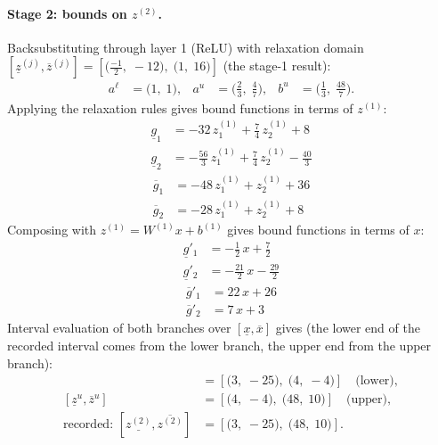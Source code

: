 \documentclass[11pt]{article}
\begin{document}
\paragraph{Stage 2: bounds on $z^{(2)}$.}
Backsubstituting through layer 1 (ReLU) with relaxation domain $[\underline{z}^{(j)}, \overline{z}^{(j)}] = [\bigl(\frac{-1}{2},\; -12\bigr),\; \bigl(1,\; 16\bigr)]$ (the stage-1 result):
\begin{align*}
a^{\ell} &= \bigl(1,\; 1\bigr), & a^{u} &= \bigl(\frac{2}{3},\; \frac{4}{7}\bigr), & b^{u} &= \bigl(\frac{1}{3},\; \frac{48}{7}\bigr).
\end{align*}
Applying the relaxation rules gives bound functions in terms of $z^{(1)}$:
\begin{align*}
\underline{g}_{1} &= -32\,z^{(1)}_{1} + \frac{7}{4}\,z^{(1)}_{2} + 8 \\
\underline{g}_{2} &= -\frac{56}{3}\,z^{(1)}_{1} + \frac{7}{4}\,z^{(1)}_{2} - \frac{40}{3}
\end{align*}
\begin{align*}
\overline{g}_{1} &= -48\,z^{(1)}_{1} + z^{(1)}_{2} + 36 \\
\overline{g}_{2} &= -28\,z^{(1)}_{1} + z^{(1)}_{2} + 8
\end{align*}
Composing with $z^{(1)} = W^{(1)} x + b^{(1)}$ gives bound functions in terms of $x$:
\begin{align*}
\underline{g}'_{1} &= -\frac{1}{2}\,x + \frac{7}{2} \\
\underline{g}'_{2} &= -\frac{21}{2}\,x - \frac{29}{2}
\end{align*}
\begin{align*}
\overline{g}'_{1} &= 22\,x + 26 \\
\overline{g}'_{2} &= 7\,x + 3
\end{align*}
Interval evaluation of both branches over $[\underline{x}, \overline{x}]$ gives (the lower end of the recorded interval comes from the lower branch, the upper end from the upper branch):
\begin{align*}
[\underline{z}^{\ell}, \overline{z}^{\ell}] &= [\bigl(3,\; -25\bigr),\; \bigl(4,\; -4\bigr)] \quad\text{(lower)}, \\
[\underline{z}^{u}, \overline{z}^{u}] &= [\bigl(4,\; -4\bigr),\; \bigl(48,\; 10\bigr)] \quad\text{(upper)}, \\
\text{recorded: } [\underline{z^{(2)}}, \overline{z^{(2)}}] &= [\bigl(3,\; -25\bigr),\; \bigl(48,\; 10\bigr)].
\end{align*}
\end{document}
